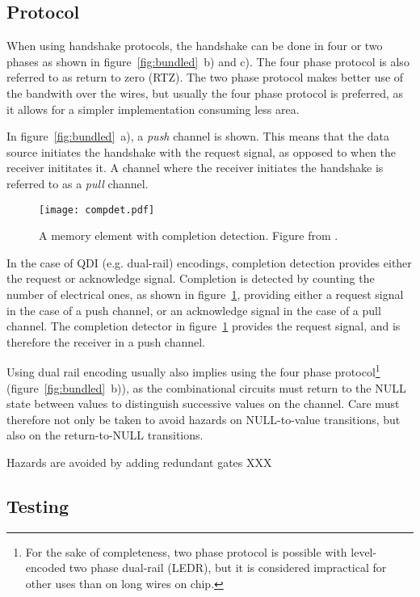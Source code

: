 \subsection{Protocol}

When using handshake protocols, the handshake can be done in four or
two phases as shown in figure~\ref{fig:bundled}~b) and c). The four
phase protocol is also referred to as return to zero (RTZ). The two
phase protocol makes better use of the bandwith over the wires, but
usually the four phase protocol is preferred, as it allows for a
simpler implementation consuming less area.

In figure~\ref{fig:bundled}~a), a \emph{push} channel is shown. This
means that the data source initiates the handshake with the request
signal, as opposed to when the receiver inititates it. A channel where
the receiver initiates the handshake is referred to as a \emph{pull}
channel.

\begin{figure}[htbp]
  \centering
  \texttt{[image: compdet.pdf]}
  \caption{A memory element with completion detection. Figure from
    \cite[pp. 21]{sparso}.}
  \label{fig:compdet}
\end{figure}

In the case of QDI (e.g. dual-rail) encodings, completion detection
provides either the request or acknowledge signal. Completion is
detected by counting the number of electrical ones, as shown in
figure~\ref{fig:compdet}, providing either a request signal in the
case of a push channel, or an acknowledge signal in the case of a pull
channel. The completion detector in figure~\ref{fig:compdet} provides
the request signal, and is therefore the receiver in a push channel.

Using dual rail encoding usually also implies using the four phase
protocol\footnote{For the sake of completeness, two phase protocol is
  possible with level-encoded two phase dual-rail (LEDR)\cite{ledr},
  but it is considered impractical for other uses than on long wires
  on chip.}  (figure~\ref{fig:bundled}~b)), as the combinational
circuits must return to the NULL state between values to distinguish
successive values on the channel. Care must therefore not only be
taken to avoid hazards on NULL-to-value transitions, but also on the
return-to-NULL transitions.

Hazards are avoided by adding redundant gates XXX

\subsection{Testing}

